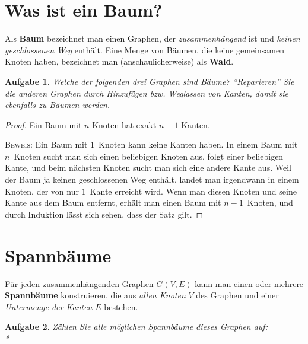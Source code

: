 \documentclass[12pt,a4paper]{report}
\theoremstyle{break}
\newtheorem{exercise}{Aufgabe}[section]
\theoremstyle{plain}
\newtheorem{proof}{Satz}[section]
\begin{document}
\section{Was ist ein Baum?}

Als \textbf{Baum} bezeichnet man einen Graphen, der
\emph{zusammenh\"{a}ngend} ist und \emph{keinen geschlossenen Weg}
enth\"{a}lt. Eine Menge von B\"{a}umen, die keine gemeinsamen Knoten
haben, bezeichnet man (anschaulicherweise) als \textbf{Wald}.

\begin{exercise}\label{exbaum}
Welche der folgenden drei Graphen sind B\"{a}ume? ``Reparieren'' Sie die
anderen Graphen durch Hinzuf\"{u}gen bzw. Weglassen von Kanten, damit
sie ebenfalls zu B\"{a}umen werden.


\end{exercise}

\begin{proof}
Ein Baum mit $n$ Knoten hat exakt $n-1$ Kanten.

\bigskip\noindent\textsc{Beweis:} Ein Baum mit $1$~Knoten kann keine Kanten haben.
In einem Baum mit $n$~Knoten sucht man sich einen beliebigen Knoten
aus, folgt einer beliebigen Kante, und beim n\"{a}chsten Knoten sucht
man sich eine andere Kante aus.
Weil der Baum ja keinen geschlossenen
Weg enth\"{a}lt, landet man irgendwann in einem Knoten, der von nur
$1$~Kante erreicht wird. 
Wenn man diesen Knoten und seine Kante aus
dem Baum entfernt, erh\"{a}lt man einen Baum mit $n-1$~Knoten, und
durch Induktion l\"{a}sst sich sehen, dass der Satz gilt.
\end{proof}

\section{Spannb\"{a}ume}

F\"ur jeden zusammenh\"{a}ngenden Graphen $G(V,E)$ kann man einen oder mehrere
\textbf{Spannb\"{a}ume} konstruieren, die aus \emph{allen Knoten} $V$ des
Graphen und einer \emph{Untermenge der Kanten} $E$ bestehen.

\begin{exercise}\label{exspan}
Z\"{a}hlen Sie alle m\"{o}glichen Spannb\"{a}ume dieses Graphen auf:\\*
\end{exercise}
\end{document}
